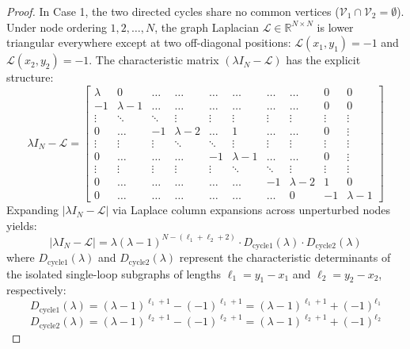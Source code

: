 \begin{proof}
In Case 1, the two directed cycles share no common vertices ($\mathcal{V}_1 \cap \mathcal{V}_2 = \emptyset$). Under node ordering $1, 2, \dots, N$, the graph Laplacian $\mathcal{L} \in \mathbb{R}^{N \times N}$ is lower triangular everywhere except at two off-diagonal positions: $\mathcal{L}(x_1, y_1) = -1$ and $\mathcal{L}(x_2, y_2) = -1$. 
The characteristic matrix $(\lambda I_N - \mathcal{L})$ has the explicit structure:
\begin{equation}\label{eq:case1_matrix_structure}
	\lambda I_N - \mathcal{L} = \begin{bmatrix}
		\lambda & 0 & \dots & \dots & \dots & \dots & \dots & \dots & 0 & 0\\
		-1 & \lambda-1 & \dots & \dots & \dots & \dots & \dots & \dots & 0 & 0\\
		\vdots & \ddots & \ddots & \vdots & \vdots & \vdots & \vdots & \vdots & \vdots & \vdots \\
		0 & \dots & -1 & \lambda-2 & \dots & 1 & \dots & \dots & 0 & \vdots \\
		\vdots & \vdots & \vdots & \ddots & \ddots & \vdots & \vdots & \vdots & \vdots & \vdots \\
		0 & \dots & \dots & \dots & -1 & \lambda-1 & \dots & \dots & 0 & \vdots\\
		\vdots & \vdots & \vdots & \vdots & \vdots & \ddots & \ddots & \vdots & \vdots & \vdots \\
		0 & \dots & \dots & \dots & \dots & \dots & -1 & \lambda-2 & 1 & 0\\
		0 & \dots & \dots & \dots & \dots & \dots & \dots & 0 & -1 & \lambda-1
	\end{bmatrix}
\end{equation}
Expanding $|\lambda I_N - \mathcal{L}|$ via Laplace column expansions across unperturbed nodes yields:
\begin{equation}\label{eq:case1_det_decoupled}
	|\lambda I_N - \mathcal{L}| = \lambda (\lambda-1)^{N - (\ell_1 + \ell_2 + 2)} \cdot D_{\text{cycle1}}(\lambda) \cdot D_{\text{cycle2}}(\lambda)
\end{equation}
where $D_{\text{cycle1}}(\lambda)$ and $D_{\text{cycle2}}(\lambda)$ represent the characteristic determinants of the isolated single-loop subgraphs of lengths $\ell_1 = y_1 - x_1$ and $\ell_2 = y_2 - x_2$, respectively:
\begin{equation}
	D_{\text{cycle1}}(\lambda) = (\lambda-1)^{\ell_1+1} - (-1)^{\ell_1+1} = (\lambda-1)^{\ell_1+1} + (-1)^{\ell_1}
\end{equation}
\begin{equation}
	D_{\text{cycle2}}(\lambda) = (\lambda-1)^{\ell_2+1} - (-1)^{\ell_2+1} = (\lambda-1)^{\ell_2+1} + (-1)^{\ell_2}
\end{equation}


\end{proof}
